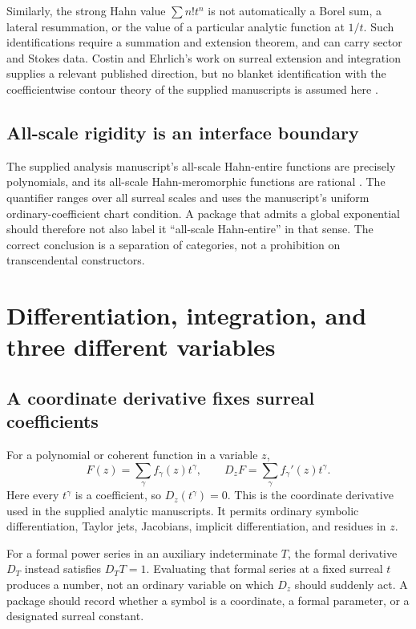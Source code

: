 \documentclass[11pt,letterpaper]{article}
\numberwithin{equation}{section}
\theoremstyle{definition}
\theoremstyle{remark}\newtheorem{remark}[theorem]{Remark}
\begin{document}
Similarly, the strong Hahn value $\sum n!t^n$ is not automatically a Borel
sum, a lateral resummation, or the value of a particular analytic function
at $1/t$. Such identifications require a summation and extension theorem,
and can carry sector and Stokes data. Costin and Ehrlich's work on surreal
extension and integration supplies a relevant published direction, but no
blanket identification with the coefficientwise contour theory of the
supplied manuscripts is assumed here \cite{CostinEhrlich,SourceAnalysis}.

\subsection{All-scale rigidity is an interface boundary}
The supplied analysis manuscript's all-scale Hahn-entire functions are
precisely polynomials, and its all-scale Hahn-meromorphic functions are
rational \cite{SourceAnalysis}. The quantifier ranges over all surreal scales
and uses the manuscript's uniform ordinary-coefficient chart condition.
A package that admits a global exponential should therefore not also label
it ``all-scale Hahn-entire'' in that sense. The correct conclusion is a
separation of categories, not a prohibition on transcendental constructors.

\section{Differentiation, integration, and three different variables}
\label{sec:calculus}

\subsection{A coordinate derivative fixes surreal coefficients}
For a polynomial or coherent function in a variable $z$,
\[
 F(z)=\sum_\gamma f_\gamma(z)t^\gamma,
 \qquad D_zF=\sum_\gamma f_\gamma'(z)t^\gamma.
\]
Here every $t^\gamma$ is a coefficient, so $D_z(t^\gamma)=0$. This is the
coordinate derivative used in the supplied analytic manuscripts. It permits
ordinary symbolic differentiation, Taylor jets, Jacobians, implicit
differentiation, and residues in $z$.

For a formal power series in an auxiliary indeterminate $T$, the formal
derivative $D_T$ instead satisfies $D_TT=1$. Evaluating that formal series at
a fixed surreal $t$ produces a number, not an ordinary variable on which
$D_z$ should suddenly act. A package should record whether a symbol is a
coordinate, a formal parameter, or a designated surreal constant.
\end{document}
